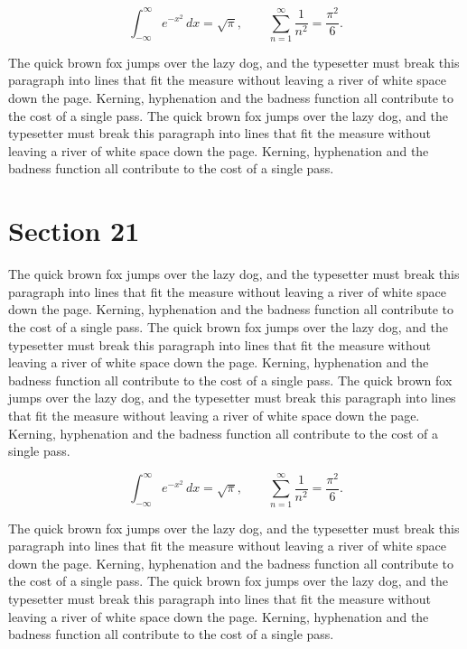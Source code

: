 \documentclass{article}
\begin{document}
\begin{equation}
\int_{-\infty}^{\infty} e^{-x^{2}}\,dx = \sqrt{\pi}, \qquad
\sum_{n=1}^{\infty} \frac{1}{n^{2}} = \frac{\pi^{2}}{6}.
\end{equation}

The quick brown fox jumps over the lazy dog, and the typesetter must break this paragraph into lines that fit the measure without leaving a river of white space down the page. Kerning, hyphenation and the badness function all contribute to the cost of a single pass. The quick brown fox jumps over the lazy dog, and the typesetter must break this paragraph into lines that fit the measure without leaving a river of white space down the page. Kerning, hyphenation and the badness function all contribute to the cost of a single pass. 
\section{Section 21}
The quick brown fox jumps over the lazy dog, and the typesetter must break this paragraph into lines that fit the measure without leaving a river of white space down the page. Kerning, hyphenation and the badness function all contribute to the cost of a single pass. The quick brown fox jumps over the lazy dog, and the typesetter must break this paragraph into lines that fit the measure without leaving a river of white space down the page. Kerning, hyphenation and the badness function all contribute to the cost of a single pass. The quick brown fox jumps over the lazy dog, and the typesetter must break this paragraph into lines that fit the measure without leaving a river of white space down the page. Kerning, hyphenation and the badness function all contribute to the cost of a single pass. 

\begin{equation}
\int_{-\infty}^{\infty} e^{-x^{2}}\,dx = \sqrt{\pi}, \qquad
\sum_{n=1}^{\infty} \frac{1}{n^{2}} = \frac{\pi^{2}}{6}.
\end{equation}

The quick brown fox jumps over the lazy dog, and the typesetter must break this paragraph into lines that fit the measure without leaving a river of white space down the page. Kerning, hyphenation and the badness function all contribute to the cost of a single pass. The quick brown fox jumps over the lazy dog, and the typesetter must break this paragraph into lines that fit the measure without leaving a river of white space down the page. Kerning, hyphenation and the badness function all contribute to the cost of a single pass. 
\end{document}
